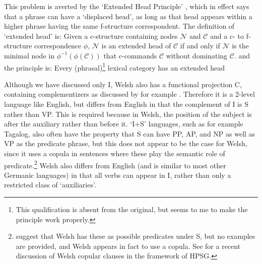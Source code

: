 \documentclass[output=paper,hidelinks]{langscibook}
\begin{document}
This problem is
averted by the `Extended Head Principle' \citep[135-137]{BresnanEtAl2016},
which in effect says that a phrase can have a `displaced head',
as long as that head appears within a higher phrase having the same
f-structure correspondent.  The definition of `extended head' is:
\ea
Given a c-structure containing nodes $\mathcal{N}$ and $\mathcal{C}$ and a c- to f-structure
correspondence $\phi$, $\mathcal{N}$ is an extended head of $\mathcal{C}$  if and only if
$\mathcal{N}$ is the minimal node in $\phi^{-1}(\phi(\mathcal{C}))$ that c-commands $\mathcal{C}$ without
dominating $\mathcal{C}$. \citep[136]{BresnanEtAl2016}
\z
and the principle is:
\ea
Every (phrasal)\footnote
 {This qualification is absent from the original, but seems to me
 to make the principle work properly.}
 lexical category has an extended head
\z

Although we have discussed only I, Welsh also has a functional projection
C, containing complementizers as discussed by for example \citet{Roberts2005}.
Therefore it is a 2-level language like English, but differs from English in
that the complement of I is S rather than VP.  This is required because
in Welsh, the position of the subject is after the auxiliary rather than
before it.  `I+S' languages, such as for example Tagalog, also often have
the property that S can have PP, AP, and NP as well as VP as the predicate
phrase, but this does not appear to be the case for Welsh, since it uses
a copula in sentences where these play the semantic role of predicate.\footnote
 {\citet[130]{BresnanEtAl2016} suggest that Welsh has these as possible predicates under S,
 but no examples are provided, and Welsh appears in fact to use a copula.
 See \citet{Borsley2019} for a recent discussion of Welsh copular clauses
 in the framework of HPSG.}
Welsh also differs from English (and is similar to most other Germanic languages) in
that all verbs can appear in I, rather than only a restricted class of
`auxiliaries'.
 
\end{document}
